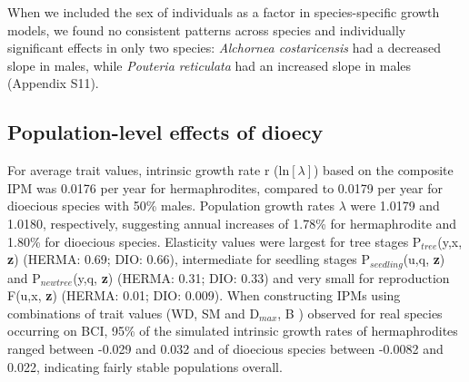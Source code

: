 \documentclass[b5paper,justified]{tufte-book} %
\begin{document}
\begin{fullwidth}
When we included the sex of individuals as a factor in species-specific growth models, we found no consistent patterns across species and individually significant effects in only two species: \textit{Alchornea costaricensis} had a decreased slope in males, while \textit{Pouteria reticulata} had an increased slope in males (Appendix S11).

\subsection{Population-level effects of dioecy}
For average trait values, intrinsic growth rate r (ln$[\lambda]$) based on the composite IPM was 0.0176 per year for hermaphrodites, compared to 0.0179 per year for dioecious species with 50\% males. Population growth rates $\lambda$ were 1.0179 and 1.0180, respectively, suggesting annual increases of 1.78\% for hermaphrodite and 1.80\% for dioecious species. Elasticity values were largest for tree stages P$_{tree}$(y,x, \textbf{z}) (HERMA: 0.69; DIO: 0.66), intermediate for seedling stages P$_{seedling}$(u,q, \textbf{z}) and P$_{new tree}$(y,q, \textbf{z}) (HERMA: 0.31; DIO: 0.33) and very small for reproduction F(u,x, \textbf{z}) (HERMA: 0.01; DIO: 0.009). When constructing IPMs using combinations of trait values (WD, SM and D$_{max}$, B ) observed for real species occurring on BCI, 95\% of the simulated intrinsic growth rates of hermaphrodites ranged between -0.029 and 0.032 and of dioecious species between -0.0082 and 0.022, indicating fairly stable populations overall.


\end{fullwidth}
\end{document}
